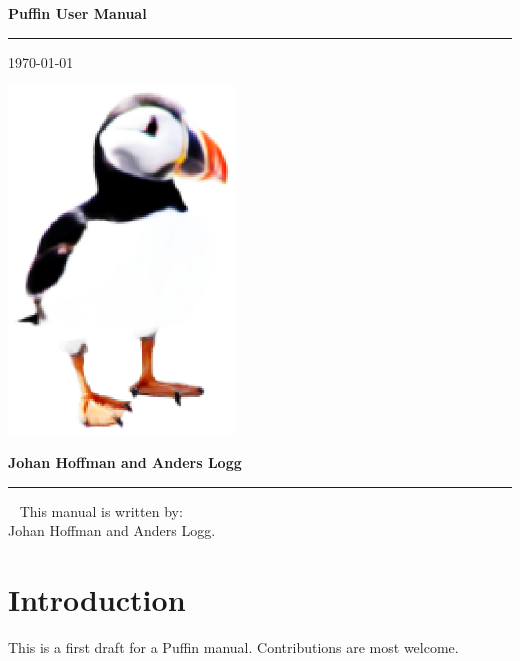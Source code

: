 \documentclass[12pt]{article}
\begin{document}

\thispagestyle{empty}

\Large
\textbf{Puffin User Manual} \\
\vspace{-0.5cm}
\hrule
\hfill
\small
\today

\vspace{3cm}

\begin{center}
\includegraphics[width=6cm]{eps/puffin.eps}
\end{center}

\vfill

\normalsize
\textbf{Johan Hoffman and Anders Logg}
\hrule

\newpage


\ 
\vfill
This manual is written by: \\
Johan Hoffman and Anders Logg.
\thispagestyle{empty}

\cleardoublepage


\tableofcontents
\newpage

\cleardoublepage
\section{Introduction}

This is a first draft for a Puffin manual. Contributions are most welcome.
\end{document}
